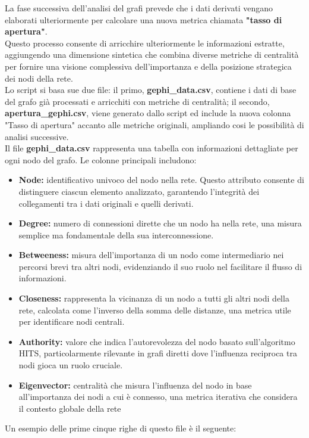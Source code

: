 \documentclass[12pt]{article}
\begin{document}
	La fase successiva dell'analisi del grafi prevede che i dati derivati vengano elaborati ulteriormente per calcolare una nuova metrica chiamata \textbf{"tasso di apertura"}.\\
	Questo processo consente di arricchire ulteriormente le informazioni estratte, aggiungendo una dimensione sintetica che combina diverse metriche di centralità per fornire una visione complessiva dell'importanza e della posizione strategica dei nodi della rete.\\
	Lo script si basa sue due file: il primo, \textbf{gephi\_data.csv}, contiene i dati di base del grafo già processati e arricchiti con metriche di centralità; il secondo, \textbf{apertura\_gephi.csv}, viene generato dallo script ed include la nuova colonna "Tasso di apertura" accanto alle metriche originali, ampliando cosi le possibilità di analisi successive.\\
	Il file \textbf{gephi\_data.csv} rappresenta una tabella con informazioni dettagliate per ogni nodo del grafo. Le colonne principali includono:
	\begin{itemize}[label=] 
		\item \textbf{Node:} identificativo univoco del nodo nella rete. Questo attributo consente di distinguere ciascun elemento analizzato, garantendo l'integrità dei collegamenti tra i dati originali e quelli derivati.
		\item \textbf{Degree:} numero di connessioni dirette che un nodo ha nella rete, una misura semplice ma fondamentale della sua interconnessione.
		\item \textbf{Betweeness:} misura dell'importanza di un nodo come intermediario nei percorsi brevi tra altri nodi, evidenziando il suo ruolo nel facilitare il flusso di informazioni.
		\item \textbf{Closeness:} rappresenta la vicinanza di un nodo a tutti gli altri nodi della rete, calcolata come l'inverso della somma delle distanze, una metrica utile per identificare nodi centrali.
		\item \textbf{Authority:} valore che indica l'autorevolezza del nodo basato sull'algoritmo HITS, particolarmente rilevante in grafi diretti dove l'influenza reciproca tra nodi gioca un ruolo cruciale.
		\item \textbf{Eigenvector:} centralità che misura l'influenza del nodo in base all'importanza dei nodi a cui è connesso, una metrica iterativa che considera il contesto globale della rete
	\end{itemize}
	Un esempio delle prime cinque righe di questo file è il seguente:
\end{document}
